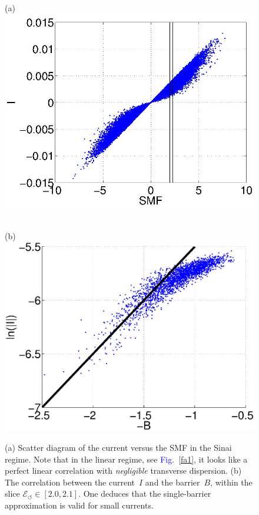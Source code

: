 \documentclass[aps,pre,floats,floatfix,twocolumn]{revtex4}
\newcommand{\Fig}[1]{\textcolor{blue}{Fig.}\!\!~\ref{#1}}
\begin{document}
\begin{figure}

\hspace*{-10mm} (a) \\
\includegraphics[width=0.8\hsize]{IvsSMF2.jpg}

\ \\

\hspace*{-10mm} (b) \\
\includegraphics[width=0.8\hsize]{BvsLnI.eps}

\caption{(a) Scatter diagram of the current versus the SMF in the Sinai regime.
Note that in the linear regime, see \Fig{fa1}, it looks like a perfect linear 
correlation with {\em negligible} transverse dispersion.  
(b) The correlation between the current~$I$ and the barrier~$B$,  
within the slice ${\mathcal{E}_{\circlearrowleft} \in [2.0,2.1]}$. 
One deduces that the single-barrier approximation is valid for small currents.}

\label{f4}
\end{figure}
\end{document}

